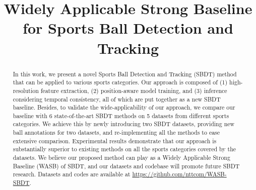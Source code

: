 \documentclass{bmvc2k}
\title{Widely Applicable Strong Baseline for Sports Ball Detection and Tracking}
\begin{document}
\maketitle

\begin{abstract}
In this work, we present a novel Sports Ball Detection and Tracking (SBDT) method that can be applied to various sports categories.
Our approach is composed of (1) high-resolution feature extraction, (2) position-aware model training, and (3) inference considering temporal consistency, all of which are put together as a new SBDT baseline.
Besides, to validate the wide-applicability of our approach, we compare our baseline with 6 state-of-the-art SBDT methods on 5 datasets from different sports categories.
We achieve this by newly introducing two SBDT datasets, providing new ball annotations for two datasets, and re-implementing all the methods to ease extensive comparison.
Experimental results demonstrate that our approach is substantially superior to existing methods on all the sports categories covered by the datasets.
We believe our proposed method can play as a Widely Applicable Strong Baseline (WASB) of SBDT, and our datasets and codebase will promote future SBDT research.
Datasets and codes are available at \url{https://github.com/nttcom/WASB-SBDT}.
\end{abstract}
\end{document}
